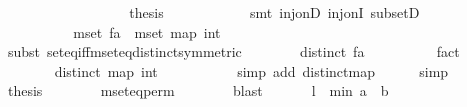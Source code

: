 \begin{isabellebody}
\ \ \ \ \ \ \ \ \isamarkupfalse%
\isanewline
\ \ \ \ \ \ \ \ \isamarkupfalse%
\ {\isacharquery}thesis\isanewline
\ \ \ \ \ \ \ \ \ \ \isamarkupfalse%
\ {\isacharparenleft}smt\ inj{\isacharunderscore}onD\ inj{\isacharunderscore}onI\ subsetD{\isacharparenright}\isanewline
\ \ \ \ \ \ \isamarkupfalse%
\isanewline
\ \ \ \ \isamarkupfalse%
\isanewline
\ \ \ \ \isanewline
\ \ \ \ \isamarkupfalse%
\ {\isachardoublequoteopen}mset\ {\isacharquery}fa\ {\isacharequal}\ mset\ {\isacharparenleft}map\ int\ {\isacharbrackleft}{}{\isachardot}{\isachardot}{\isacharless}{}{}{}{}{\isacharplus}{}{\isacharbrackright}{\isacharparenright}{\isachardoublequoteclose}\isanewline
\ \ \ \ \isamarkupfalse%
\ {\isacharparenleft}subst\ set{\isacharunderscore}eq{\isacharunderscore}iff{\isacharunderscore}mset{\isacharunderscore}eq{\isacharunderscore}distinct{\isacharbrackleft}symmetric{\isacharbrackright}{\isacharparenright}\isanewline
\ \ \ \ \ \ \isamarkupfalse%
\ {\isachardoublequoteopen}distinct\ {\isacharquery}fa{\isachardoublequoteclose}\isanewline
\ \ \ \ \ \ \ \ \isamarkupfalse%
\ fact\isanewline
\ \ \ \ \isamarkupfalse%
\ \isanewline
\ \ \ \ \ \ \isamarkupfalse%
\ {\isachardoublequoteopen}distinct\ {\isacharparenleft}map\ int\ {\isacharbrackleft}{}{\isachardot}{\isachardot}{\isacharless}{}{}{}{}{\isacharplus}{}{\isacharbrackright}{\isacharparenright}{\isachardoublequoteclose}\isanewline
\ \ \ \ \ \ \ \ \isamarkupfalse%
\ {\isacharparenleft}simp\ add{\isacharcolon}\ distinct{\isacharunderscore}map{\isacharparenright}\isanewline
\ \ \ \ \isamarkupfalse%
\ simp\isanewline
\isanewline
\ \ \ \ \isamarkupfalse%
\ {\isacharquery}thesis\isanewline
\ \ \ \ \ \ \isamarkupfalse%
\ mset{\isacharunderscore}eq{\isacharunderscore}perm\isanewline
\ \ \ \ \ \ \isamarkupfalse%
\ blast\isanewline
\ \ \isamarkupfalse%
\isanewline
\isanewline
\ \ \isamarkupfalse%
\ {\isacharquery}l\ {\isacharequal}\ {\isachardoublequoteopen}min\ {\isacharparenleft}a\ {}{}{}{}{\isacharparenright}\ {\isacharparenleft}b\ {}{}{}{}{\isacharparenright}{\isachardoublequoteclose}\isanewline
\ \ \isamarkupfalse%

\end{isabellebody}
